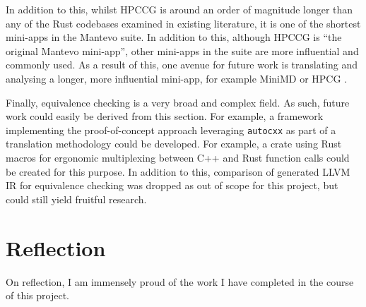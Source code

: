 In addition to this, whilst HPCCG is around an order of magnitude longer than any of the Rust codebases examined in existing literature, it is one of the shortest mini-apps in the Mantevo suite. In addition to this, although HPCCG is ``the original Mantevo mini-app'', other mini-apps in the suite are more influential and commonly used. As a result of this, one avenue for future work is translating and analysing a longer, more influential mini-app, for example MiniMD \cite{osti_1231191} or HPCG \cite{dongarra2015hpcg}.

Finally, equivalence checking is a very broad and complex field. As such, future work could easily be derived from this section. For example, a framework implementing the proof-of-concept approach leveraging \texttt{autocxx} as part of a translation methodology could be developed. For example, a crate using Rust macros for ergonomic multiplexing between C++ and Rust function calls could be created for this purpose. In addition to this, comparison of generated LLVM IR for equivalence checking was dropped as out of scope for this project, but could still yield fruitful research.



\section{Reflection}
\label{sec:reflection}



On reflection, I am immensely proud of the work I have completed in the course of this project.

